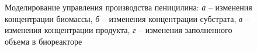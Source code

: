\begin{figure}[ht!]
\begin{minipage}[h]{0.49\linewidth}
	\end{minipage}
	\hfill
	\begin{minipage}[h]{0.49\linewidth}
	\end{minipage}
	\hfill
	\begin{minipage}[h]{0.49\linewidth}
	\end{minipage}
	\caption{Моделирование управления производства пеницилина: \textit{а} -- изменения концентрации биомассы, \textit{б} -- изменения концентрации субстрата, \textit{в} -- изменения концентрации продукта, \textit{г} -- изменения заполненного объема в биореакторе}
		\label{fig:bio-ch3}
	\end{figure}
%

